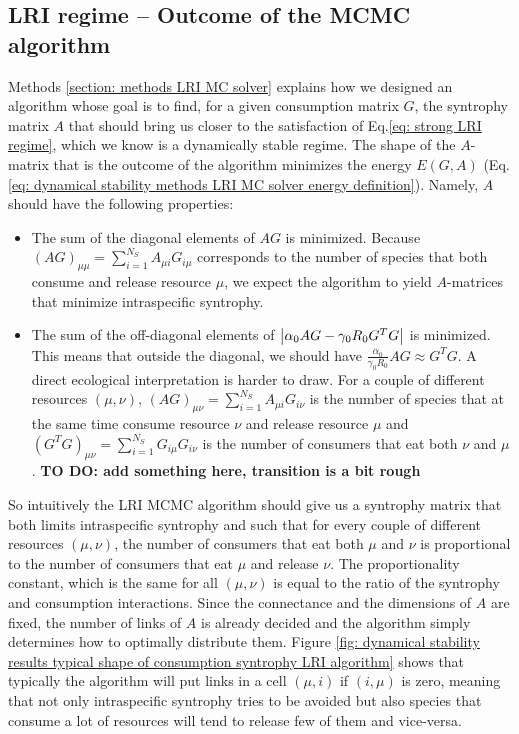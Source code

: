 \documentclass[12pt, titlepage]{report}
\begin{document}
\subsection{LRI regime -- Outcome of the MCMC algorithm}
Methods \ref{section: methods LRI MC solver} explains how we designed an algorithm whose goal is to find, for a given consumption matrix $G$, the syntrophy matrix $A$ that should bring us closer to the satisfaction of Eq.\eqref{eq: strong LRI regime}, which we know is a dynamically stable regime. The shape of the $A$-matrix that is the outcome of the algorithm minimizes the energy $E(G,A)$ (Eq.\ref{eq: dynamical stability methods LRI MC solver energy definition}). Namely, $A$ should have the following properties:
\begin{itemize}
\item The sum of the diagonal elements of $AG$ is minimized. Because $(AG)_{\mu\mu}=\sum_{i=1}^{N_S} A_{\mu i} G_{i\mu}$ corresponds to the number of species that both consume and release resource $\mu$, we expect the algorithm to yield $A$-matrices that minimize intraspecific syntrophy.
\item The sum of the off-diagonal elements of $\left|{\alpha_0 AG-\gamma_0 R_0 G^T G}\right|$ is minimized. This means that outside the diagonal, we should have $\frac{\alpha_0}{\gamma_0 R_0} AG \approx  G^T G$. A direct ecological interpretation is harder to draw. For a couple of different resources $(\mu,\nu)$,  $(AG)_{\mu\nu}=\sum_{i=1}^{N_S} A_{\mu i} G_{i\nu}$ is the number of species that at the same time consume resource $\nu$ and release resource $\mu$ and $(G^TG)_{\mu\nu}=\sum_{i=1}^{N_S} G_{i\mu}G_{i\nu}$ is the number of consumers that eat both $\nu$ and $\mu$. \textbf{TO DO: add something here, transition is a bit rough}
\end{itemize}
So intuitively the LRI MCMC algorithm should give us a syntrophy matrix that both limits intraspecific syntrophy and such that for every couple of different resources $(\mu, \nu)$, the number of consumers that eat both $\mu$ and $\nu$ is proportional to the number of consumers that eat $\mu$ and release $\nu$. The proportionality constant, which is the same for all $(\mu, \nu)$ is equal to the ratio of the syntrophy and consumption interactions.
 Since the connectance and the dimensions of $A$ are fixed, the number of links of $A$ is already decided and the algorithm simply determines how to optimally distribute them. Figure \ref{fig: dynamical stability results typical shape of consumption syntrophy LRI algorithm} shows that typically the algorithm will put links in a cell $(\mu,i)$ if $(i, \mu)$ is zero, meaning that not only intraspecific syntrophy tries to be avoided but also species that consume a lot of resources will tend to release few of them and vice-versa.
\end{document}

